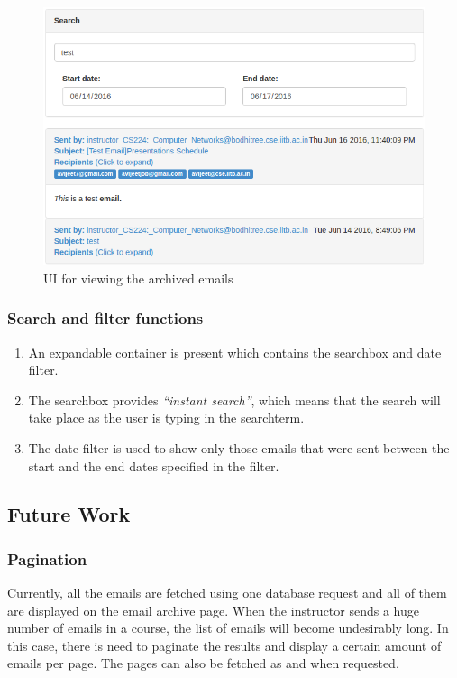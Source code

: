 \begin{figure}[h]
\centering
\includegraphics[width=0.95\linewidth]{./media/email_archive_ui}
\caption{UI for viewing the archived emails}
\label{fig:ea_ui}
\end{figure}

\subsubsection*{Search and filter functions}

\begin{enumerate}
	\item An expandable container is present which contains the searchbox and date filter. 
	\item The searchbox provides \textit{``instant search''}, which means that the search will take place as the user is typing in the searchterm.
	\item The date filter is used to show only those emails that were sent between the start and the end dates specified in the filter.
\end{enumerate}

\subsection{Future Work}

\subsubsection*{Pagination}

\hspace{0.35cm} Currently, all the emails are fetched using one database request and all of them are displayed on the email archive page. When the instructor sends a huge number of emails in a course, the list of emails will become undesirably long. In this case, there is need to paginate the results and display a certain amount of emails per page. The pages can also be fetched as and when requested.
